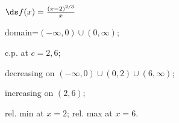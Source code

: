 {$\ds f(x) =\frac{(x-2)^{2/3}}{x}$
}
{domain=$(-\infty,0)\cup(0,\infty)$;

c.p. at $c=2,6$; 

decreasing on $(-\infty,0)\cup (0,2)\cup(6,\infty)$;

increasing on $(2,6)$;

rel. min at $x=2$;
rel. max at $x=6$.
}
